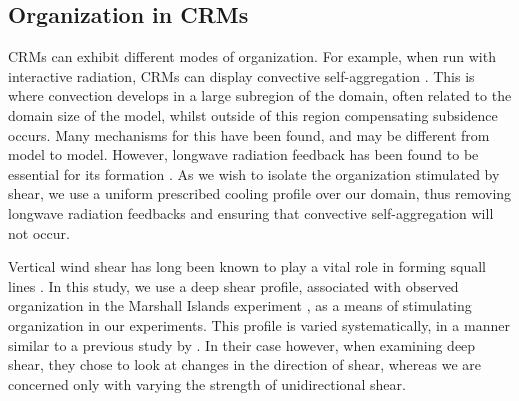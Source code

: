 \documentclass[11pt,a4paper]{article}
\newcommand\todo[1]{\textbf{TODO: #1}}
\begin{document}
\subsection{Organization in CRMs}
CRMs can exhibit different modes of organization. For example, when run with interactive radiation, CRMs can display convective self-aggregation \parencite{wing2017convective}. 
This is where convection develops in a large subregion of the domain, often related to the domain size of the model, whilst outside of this region compensating subsidence occurs. Many mechanisms for this have been found, and may be different from model to model. 
However, longwave radiation feedback has been found to be essential for its formation \parencite{wing2017convective}. As we wish to isolate the organization stimulated by shear, we use a uniform prescribed cooling profile over our domain, thus removing longwave radiation feedbacks and ensuring that convective self-aggregation will not occur.


Vertical wind shear has long been known to play a vital role in forming squall lines \parencite{TMM1982, RKW1988}. In this study, we use a deep shear profile, associated with observed organization in the Marshall Islands experiment \parencite{yanai1973determination}, as a means of stimulating organization in our experiments. This profile is varied systematically, in a manner similar to a previous study by \cite{RE2001}. In their case however, when examining deep shear, they chose to look at changes in the direction of shear, whereas we are concerned only with varying the strength of unidirectional shear.


\end{document}
